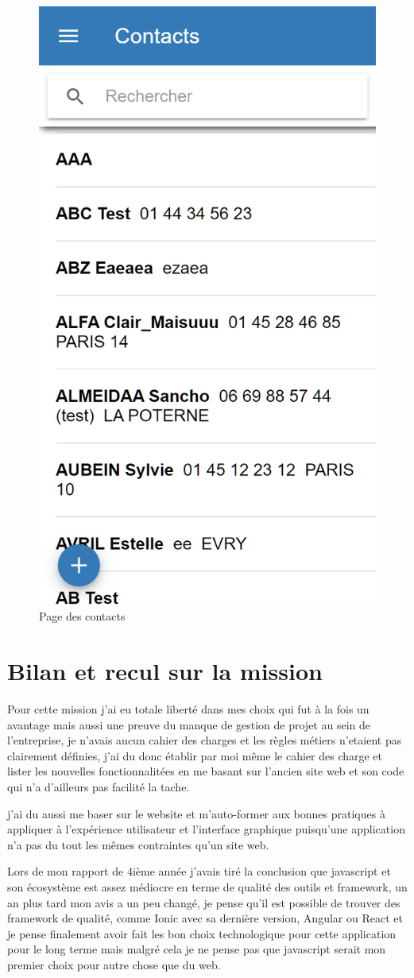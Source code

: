 \begin{figure}[!h]
	\centering
	\includegraphics[width=0.35\linewidth]{Images/contact}
	\caption{Page des contacts}
	\label{fig:archhexa}
\end{figure}



\newpage
\section{Bilan et recul sur la mission}
Pour cette mission j'ai eu totale liberté dans mes choix qui fut à la fois un avantage mais 
aussi une preuve du manque de gestion de projet au sein de l'entreprise, je n'avais 
aucun cahier des charges et les règles métiers n'etaient pas clairement définies,
j'ai du donc établir par moi même le cahier des charge et lister les nouvelles fonctionnalitées 
en me basant sur l'ancien site web et son code qui n'a d'ailleurs pas facilité la tache. \newline

j'ai du aussi me baser sur le website et m'auto-former aux bonnes pratiques 
à appliquer à l'expérience utilisateur et l'interface graphique puisqu'une application
n'a pas du tout les mêmes contraintes qu'un site web. \newline

Lors de mon rapport de 4ième année j'avais tiré la conclusion que javascript et son 
écosystème est assez médiocre en terme de qualité des outils et framework, 
un an plus tard mon avis a un peu changé, je pense qu'il est possible de trouver 
des framework de qualité, comme Ionic avec sa dernière version, Angular ou React 
et je pense finalement avoir fait les bon choix technologique pour cette application 
pour le long terme mais malgré cela je ne pense pas que javascript serait mon premier 
choix pour autre chose que du web.
 \newline




